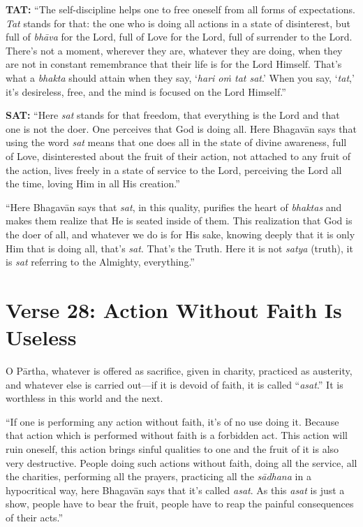 \textbf{TAT:} \enquote{The self-discipline helps one to free oneself from all forms of expectations. \textit{Tat} stands for that: the one who is doing all actions in a state of disinterest, but full of \textit{bhāva} for the Lord, full of Love for the Lord, full of surrender to the Lord. There’s not a moment, wherever they are, whatever they are doing, when they are not in constant remembrance that their life is for the Lord Himself. That’s what a \textit{bhakta} should attain when they say, \enquote{\textit{hari oṁ tat sat}.} When you say, \enquote{\textit{tat},} it’s desireless, free, and the mind is focused on the Lord Himself.}

\textbf{SAT:} \enquote{Here \textit{sat} stands for that freedom, that everything is the Lord and that one is not the doer. One perceives that God is doing all. Here Bhagavān says that using the word \textit{sat} means that one does all in the state of divine awareness, full of Love, disinterested about the fruit of their action, not attached to any fruit of the action, lives freely in a state of service to the Lord, perceiving the Lord all the time, loving Him in all His creation.}

\enquote{Here Bhagavān says that \textit{sat}, in this quality, purifies the heart of \textit{bhaktas} and makes them realize that He is seated inside of them. This realization that God is the doer of all, and whatever we do is for His sake, knowing deeply that it is only Him that is doing all, that’s \textit{sat}. That’s the Truth. Here it is not \textit{satya} (truth), it is \textit{sat} referring to the Almighty, everything.}
\section{Verse 28: Action Without Faith Is Useless}\label{sec-verse-28-action-without-faith-is-useless}

{O Pārtha, whatever is offered as sacrifice, given in charity, practiced as austerity, and whatever else is carried out---if it is devoid of faith, it is called \enquote{\textit{asat}.} It is worthless in this world and the next.}

\enquote{If one is performing any action without faith, it’s of no use doing it. Because that action which is performed without faith is a forbidden act. This action will ruin oneself, this action brings sinful qualities to one and the fruit of it is also very destructive. People doing such actions without faith, doing all the service, all the charities, performing all the prayers, practicing all the \textit{sādhana} in a hypocritical way, here Bhagavān says that it’s called \textit{asat}. As this \textit{asat} is just a show, people have to bear the fruit, people have to reap the painful consequences of their acts.}


